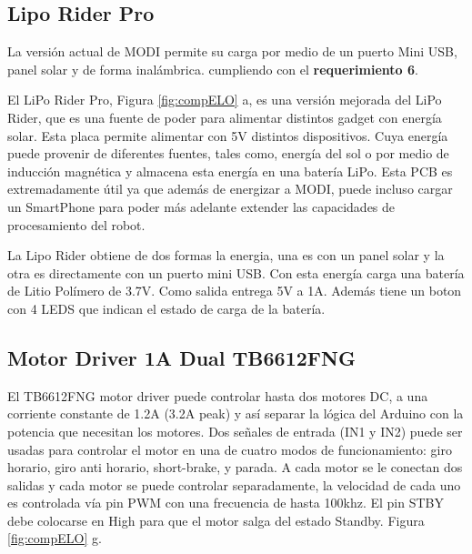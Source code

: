 \subsection{Lipo Rider Pro}
 La versión actual de MODI permite su carga por medio de un puerto Mini USB, panel solar y de forma inalámbrica. cumpliendo con el \textbf{requerimiento 6}.

El LiPo Rider Pro, Figura \ref{fig:compELO} a, es una versión mejorada del LiPo Rider, que es una fuente de poder para alimentar distintos gadget con energía solar. Esta placa permite alimentar con 5V distintos dispositivos. Cuya energía puede provenir de diferentes fuentes, tales como, energía del sol o por medio de inducción magnética y almacena esta energía en una batería LiPo. Esta PCB es extremadamente útil ya que además de energizar a MODI, puede incluso cargar un SmartPhone para poder más adelante extender las capacidades de procesamiento del robot.

La Lipo Rider obtiene de dos formas la energia, una es con un panel solar y la otra es directamente con un puerto mini USB. Con esta energía carga una batería de Litio Polímero de 3.7V. Como salida entrega 5V a 1A. Además tiene un boton con 4 LEDS que indican el estado de carga de la batería.

\subsection{Motor Driver 1A Dual TB6612FNG}
El TB6612FNG motor driver puede controlar hasta dos motores DC, a una corriente constante de 1.2A (3.2A peak) y así separar la lógica del Arduino con la potencia que necesitan los motores. Dos señales de entrada (IN1 y IN2) puede ser usadas para controlar el motor en una de cuatro modos de funcionamiento: giro horario, giro anti horario, short-brake, y parada. A cada motor se le conectan dos salidas y cada motor se puede controlar separadamente, la velocidad de cada uno es controlada vía pin PWM con una frecuencia de hasta 100khz. El pin STBY debe colocarse en High para que el motor salga del estado Standby. Figura \ref{fig:compELO} g.


